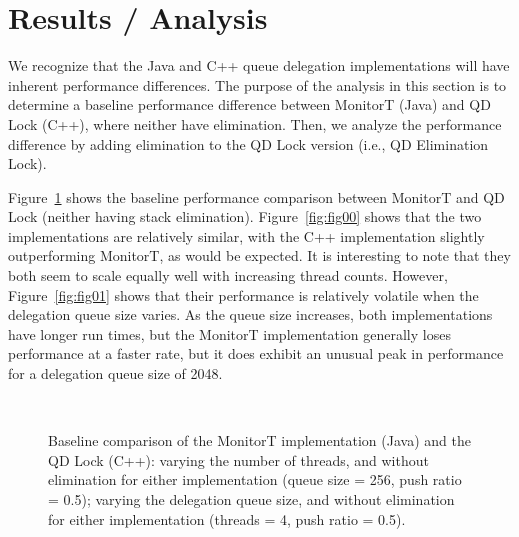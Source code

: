 \section{Results / Analysis}
We recognize that the Java and C++ queue delegation implementations will have inherent performance differences. The purpose of the analysis in this section is to determine a baseline performance difference between MonitorT (Java) and QD Lock (C++), where neither have elimination. Then, we analyze the performance difference by adding elimination to the QD Lock version (i.e., QD Elimination Lock).

Figure~\ref{fig:baseline} shows the baseline performance comparison between MonitorT and QD Lock (neither having stack elimination). Figure~\ref{fig:fig00} shows that the two implementations are relatively similar, with the C++ implementation slightly outperforming MonitorT, as would be expected. It is interesting to note that they both seem to scale equally well with increasing thread counts. However, Figure~\ref{fig:fig01} shows that their performance is relatively volatile when the delegation queue size varies. As the queue size increases, both implementations have longer run times, but the MonitorT implementation generally loses performance at a faster rate, but it does exhibit an unusual peak in performance for a delegation queue size of 2048.

\begin{figure}[]
\centering
{}
\\
\caption[]{Baseline comparison of the MonitorT implementation (Java) and the QD Lock (C++):  varying the number of threads, and without elimination for either implementation (queue size = 256, push ratio = 0.5);  varying the delegation queue size, and without elimination for either implementation (threads = 4, push ratio = 0.5).}
\label{fig:baseline}
\end{figure}

